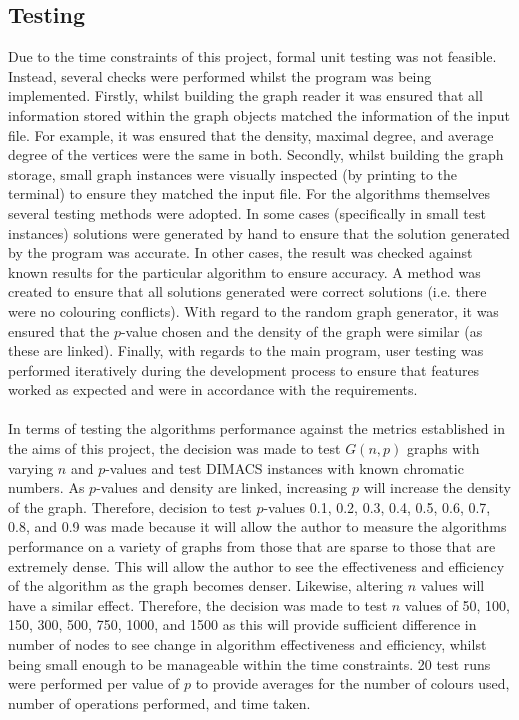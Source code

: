\subsection{Testing}
Due to the time constraints of this project, formal unit testing was not feasible. Instead, several checks were performed whilst the program was being implemented. Firstly, whilst building the graph reader it was ensured that all information stored within the graph objects matched the information of the input file. For example, it was ensured that the density, maximal degree, and average degree of the vertices were the same in both. Secondly, whilst building the graph storage, small graph instances were visually inspected (by printing to the terminal) to ensure they matched the input file. For the algorithms themselves several testing methods were adopted. In some cases (specifically in small test instances) solutions were generated by hand to ensure that the solution generated by the program was accurate. In other cases, the result was checked against known results for the particular algorithm to ensure accuracy. A method was created to ensure that all solutions generated were correct solutions (i.e. there were no colouring conflicts). With regard to the random graph generator, it was ensured that the $p$-value chosen and the density of the graph were similar (as these are linked). Finally, with regards to the main program, user testing was performed iteratively during the development process to ensure that features worked as expected and were in accordance with the requirements.
\\\\
In terms of testing the algorithms performance against the metrics established in the aims of this project, the decision was made to test $G(n, p)$ graphs with varying $n$ and $p$-values and test DIMACS instances with known chromatic numbers. As $p$-values and density are linked, increasing $p$ will increase the density of the graph. Therefore, decision to test $p$-values 0.1, 0.2, 0.3, 0.4, 0.5, 0.6, 0.7, 0.8, and 0.9 was made because it will allow the author to measure the algorithms performance on a variety of graphs from those that are sparse to those that are extremely dense. This will allow the author to see the effectiveness and efficiency of the algorithm as the graph becomes denser. Likewise, altering $n$ values will have a similar effect. Therefore, the decision was made to test $n$ values of 50, 100, 150, 300, 500, 750, 1000, and 1500 as this will provide sufficient difference in number of nodes to see change in algorithm effectiveness and efficiency, whilst being small enough to be manageable within the time constraints. 20 test runs were performed per value of $p$ to provide averages for the number of colours used, number of operations performed, and time taken.
